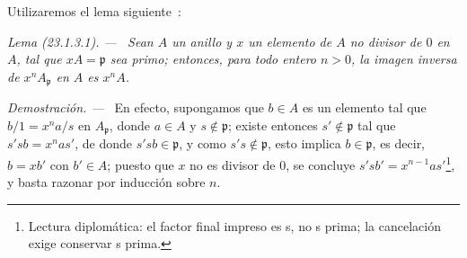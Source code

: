 \documentclass[10pt,oneside]{book}
\makeatletter
\newcommand{\setmanualcurrentlabel}[1]{\def\@currentlabel{#1}}
\newenvironment{lemma}[1][]{%
  \setmanualcurrentlabel{#1}\par\medskip\noindent\itshape Lema (#1). ---\ }{\par}
\newenvironment{proof}{%
  \par\medskip\noindent\textit{Demostración. ---\ }}{\par}
\makeatother
\begin{document}
Utilizaremos el lema siguiente~:

\begin{lemma}[23.1.3.1]
\label{0.23.1.3.1-es}
Sean $A$ un anillo y $x$ un elemento de $A$ no divisor de $0$ en $A$, tal
que $xA=\mathfrak p$ sea primo; entonces, para todo entero $n>0$, la imagen
inversa de $x^nA_{\mathfrak p}$ en $A$ es $x^nA$.
\end{lemma}

\begin{proof}
En efecto, supongamos que $b\in A$ es un elemento tal que
$b/1=x^na/s$ en $A_{\mathfrak p}$, donde $a\in A$ y
$s\notin\mathfrak p$; existe entonces $s'\notin\mathfrak p$ tal que
$s'sb=x^nas'$, de donde $s'sb\in\mathfrak p$, y como
$s's\notin\mathfrak p$, esto implica $b\in\mathfrak p$, es decir,
$b=xb'$ con $b'\in A$; puesto que $x$ no es divisor de $0$, se concluye
$s'sb'=x^{n-1}as'$\footnote{Lectura diplomática: el factor final impreso es s, no s prima; la cancelación exige conservar s prima.}, y basta razonar por inducción sobre $n$.
\end{proof}
\end{document}
